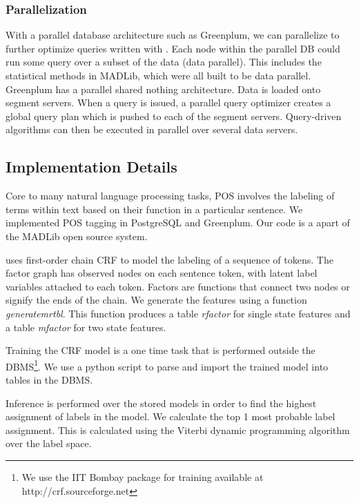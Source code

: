 \subsubsection*{Parallelization}
With a parallel database architecture such as 
Greenplum, we can parallelize to further optimize queries written
with {\system}. Each node within the parallel DB could run some query
over a subset of the data (data parallel). This includes the statistical methods
in MADLib, which were all built to be data parallel.
Greenplum has a parallel shared nothing architecture. Data is loaded onto 
segment servers. When a query is issued, a parallel query optimizer 
creates a global query plan which is pushed to each of the segment servers.
Query-driven algorithms can then be executed in parallel over several
data servers.


\subsection{Implementation Details}
\label{sec:impdis}


Core to many natural language processing tasks, POS involves the
labeling of terms within text based on their function in a particular sentence.
We implemented POS tagging in PostgreSQL and Greenplum. 
Our code is a apart of the MADLib open source system.

\system uses first-order chain CRF to model the labeling
of a sequence of tokens. The factor graph has observed nodes on each sentence
token, with latent label variables attached to each token.
Factors are functions that connect two nodes or signify the ends of the chain.
We generate the features using a function \textit{generatemrtbl}. 
This function produces a table \textit{rfactor} for single state features and a 
table \textit{mfactor} for two state features.

Training the CRF model is a one time task that is performed outside the 
DBMS\footnote{We use the IIT Bombay package for training available at 
http://crf.sourceforge.net }.
We use a python script to parse and import the trained model into 
tables in the DBMS. 

Inference is performed over the stored models in order to find the highest 
assignment of labels in the model.
We calculate the top 1 most probable label assignment. This is calculated using
the Viterbi dynamic programming algorithm over the label space.


